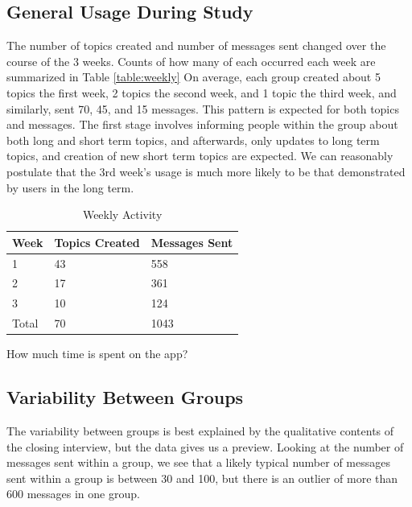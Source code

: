  \subsection{General Usage During Study}
    The number of topics created and number of messages sent changed over
    the course of the 3 weeks.
    Counts of how many of each occurred each week are summarized in
    Table \ref{table:weekly}
    On average, each group created about 5 topics the first week,
    2 topics the second week, and 1 topic the third week,
    and similarly, sent 70, 45, and 15 messages.
    This pattern is expected for both topics and messages.
    The first stage involves informing people within the
    group about both long and short term topics,
    and afterwards, only updates to long term topics,
    and creation of new short term topics are expected.
    We can reasonably postulate that the 3rd week's usage is much more likely
    to be that demonstrated by users in the long term.

    \begin{table}[h]
    \centering
    \caption{Weekly Activity}
    \label{table:compensation}
    \begin{tabular}{ l l l}
    Week & Topics Created & Messages Sent \\
    \hline
    1 & 43 & 558      \\[5pt]
    2 & 17 & 361      \\[5pt]
    3 & 10 & 124      \\[5pt]
    \hline
    Total & 70 & 1043       \\[5pt]
    \end{tabular}
    \end{table}

    How much time is spent on the app?

  \subsection{Variability Between Groups}
    The variability between groups is best explained by the
    qualitative contents of the closing interview,
    but the data gives us a preview.
    Looking at the number of messages sent within a group,
    we see that a likely typical number of messages sent within a group
    is between 30 and 100,
    but there is an outlier of more than 600 messages in one group.

